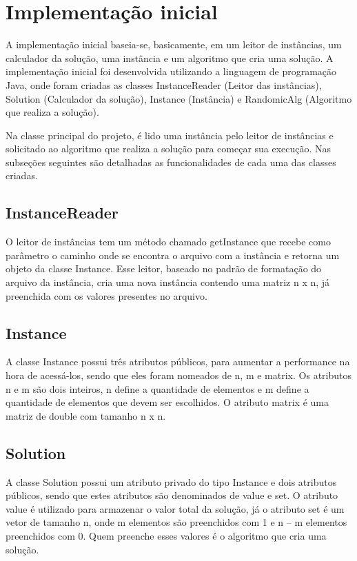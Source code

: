 \documentclass[12pt]{article}
\begin{document}
\section{Implementação inicial}

A implementação inicial baseia-se, basicamente, em um leitor de instâncias, um calculador da solução, uma instância e um algoritmo que cria uma solução. A implementação inicial foi desenvolvida utilizando a linguagem de programação Java, onde foram criadas as classes InstanceReader (Leitor das instâncias), Solution (Calculador da solução), Instance (Instância) e RandomicAlg (Algoritmo que realiza a solução). 

Na classe principal do projeto, é lido uma instância pelo leitor de instâncias e solicitado ao algoritmo que realiza a solução para começar sua execução. Nas subseções seguintes são detalhadas as funcionalidades de cada uma das classes criadas.

\subsection{InstanceReader}

O leitor de instâncias tem um método chamado getInstance que recebe como parâmetro o caminho onde se encontra o arquivo com a instância e retorna um objeto da classe Instance. Esse leitor, baseado no padrão de formatação do arquivo da instância, cria uma nova instância contendo uma matriz n x n, já preenchida com os valores presentes no arquivo.

\subsection{Instance}

A classe Instance possui três atributos públicos, para aumentar a performance na hora de acessá-los, sendo que eles foram nomeados de n, m e matrix. Os atributos n e m são dois inteiros, n define a quantidade de elementos e m define a quantidade de elementos que devem ser escolhidos. O atributo matrix é uma matriz de double com tamanho n x n.

\subsection{Solution}

A classe Solution possui um atributo privado do tipo Instance e dois atributos públicos, sendo que estes atributos são denominados de value e set. O atributo value é utilizado para armazenar o valor total da solução, já o atributo set é um vetor de tamanho n, onde m elementos são preenchidos com 1 e n – m elementos preenchidos com 0. Quem preenche esses valores é o algoritmo que cria uma solução. 
\end{document}
